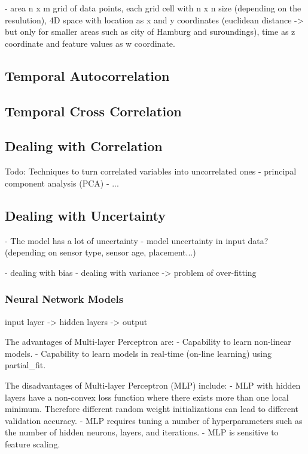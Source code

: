 - area n x m grid of data points, each grid cell with n x n size (depending on the resulution), 4D space with location as x and y coordinates (euclidean distance -> but only for smaller areas such as city of Hamburg and suroundings), time as z coordinate and feature values as w coordinate.\\

\subsection{Temporal Autocorrelation}


\subsection{Temporal Cross Correlation}

\subsection{Dealing with Correlation}

Todo: Techniques to turn correlated variables into uncorrelated ones
- principal component analysis (PCA)
- ...

\subsection{Dealing with Uncertainty}
- The model has a lot of uncertainty
- model uncertainty in input data? (depending on sensor type, sensor age, placement...)

- dealing with bias
- dealing with variance
-> problem of over-fitting

\subsubsection{Neural Network Models}
input layer -> hidden layers -> output

The advantages of Multi-layer Perceptron are:
- Capability to learn non-linear models.
- Capability to learn models in real-time (on-line learning) using partial\_fit.

The disadvantages of Multi-layer Perceptron (MLP) include:
- MLP with hidden layers have a non-convex loss function where there exists more than one local minimum. Therefore different random weight initializations can lead to different validation accuracy.
- MLP requires tuning a number of hyperparameters such as the number of hidden neurons, layers, and iterations.
- MLP is sensitive to feature scaling.

